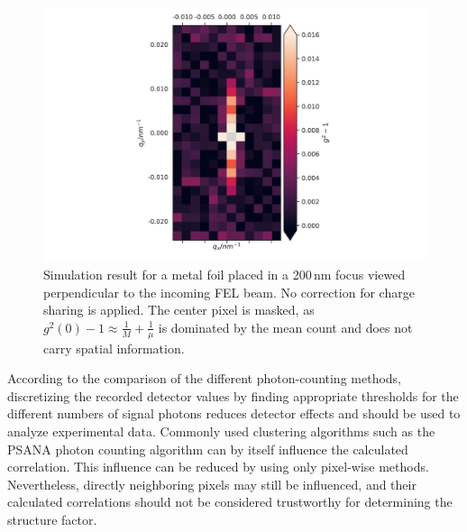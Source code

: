 \begin{figure}
	\centering
	\includegraphics[width=0.5\linewidth]{images/sim_foil5umCu_shared.pdf}
	\caption[Simulation of a metal foil with similar parameters as used in the experiment]{Simulation result for a metal foil placed in a 200\,nm focus viewed perpendicular to the incoming FEL beam. No correction for charge sharing is applied. The center pixel is masked, as $g^2(0)-1\approx 
		\frac{1}{M}+\frac{1}{\mu}$ is dominated by the mean count and does 
		not carry spatial information.}
	\label{fig:simfoil}
\end{figure}


According to the comparison of the different photon-counting methods, discretizing the recorded detector values by finding appropriate thresholds for the different numbers of signal photons reduces detector effects and should be used to analyze experimental data. Commonly used clustering algorithms such as the PSANA photon counting algorithm can by itself influence the calculated correlation. This influence can be reduced by using only pixel-wise methods. Nevertheless, directly neighboring pixels may still be influenced, and their calculated correlations should not be considered trustworthy for determining the structure factor.







